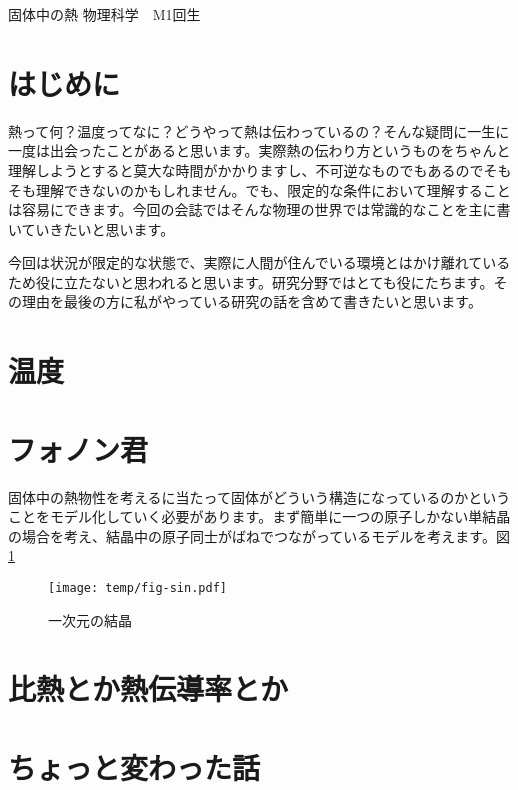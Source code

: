 \documentclass[10pt,b5paper,papersize,dvipdfmx]{jsbook}
\begin{document}


\kaishititle%
  {固体中の熱}%
  {物理科学　M1回生}%
  {}%

\section*{はじめに}
熱って何？温度ってなに？どうやって熱は伝わっているの？そんな疑問に一生に一度は出会ったことがあると思います。実際熱の伝わり方というものをちゃんと理解しようとすると莫大な時間がかかりますし、不可逆なものでもあるのでそもそも理解できないのかもしれません。でも、限定的な条件において理解することは容易にできます。今回の会誌ではそんな物理の世界では常識的なことを主に書いていきたいと思います。\par
今回は状況が限定的な状態で、実際に人間が住んでいる環境とはかけ離れているため役に立たないと思われると思います。研究分野ではとても役にたちます。その理由を最後の方に私がやっている研究の話を含めて書きたいと思います。


%
\section{温度}



\section{フォノン君}
固体中の熱物性を考えるに当たって固体がどういう構造になっているのかということをモデル化していく必要があります。まず簡単に一つの原子しかない単結晶の場合を考え、結晶中の原子同士がばねでつながっているモデルを考えます。図\ref{fig:bane}
\begin{figure}[htbp]
  \centering
  \texttt{[image: temp/fig-sin.pdf]}
  \caption{一次元の結晶}
  \label{fig:bane}
\end{figure}

\section{比熱とか熱伝導率とか}

\section{ちょっと変わった話}
\end{document}
